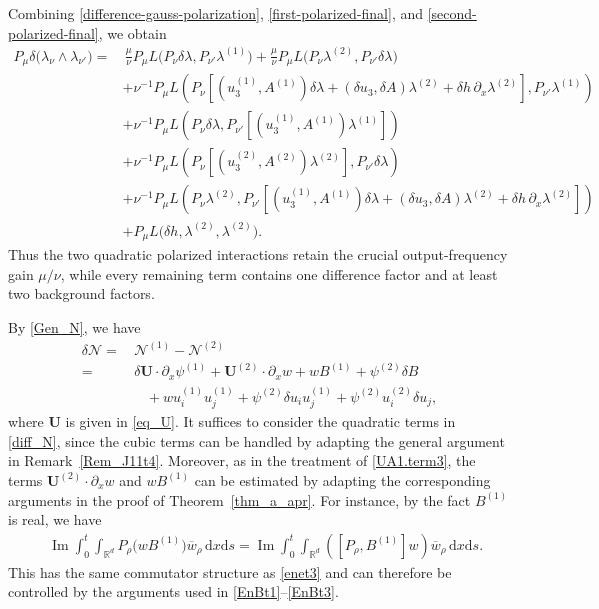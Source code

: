 \documentclass[11pt,letterpaper,reqno]{amsart}
\numberwithin{equation}{section}
\theoremstyle{definition}
\theoremstyle{remark}
\begin{document}
Combining
\eqref{difference-gauss-polarization},
\eqref{first-polarized-final}, and
\eqref{second-polarized-final}, we obtain
\begin{align}
P_\mu\delta
\bigl(
\lambda_\nu\wedge\lambda_{\nu'}
\bigr)
=&\,
\frac{\mu}{\nu}
P_\mu
L\bigl(
P_\nu\delta\lambda,
P_{\nu'}\lambda^{(1)}
\bigr)
 +
\frac{\mu}{\nu}
P_\mu
L\bigl(
P_\nu\lambda^{(2)},
P_{\nu'}\delta\lambda
\bigr)
\label{d4.polarized.codazzi}\\
&+
\nu^{-1}P_\mu
L\left(
P_\nu
\left[
(u_3^{(1)},A^{(1)})\delta\lambda
+
(\delta u_3,\delta A)\lambda^{(2)}
+
\delta h\,\partial_x\lambda^{(2)}
\right],
P_{\nu'}\lambda^{(1)}
\right)
\nonumber\\
&+
\nu^{-1}P_\mu
L\left(
P_\nu\delta\lambda,
P_{\nu'}
\left[
(u_3^{(1)},A^{(1)})\lambda^{(1)}
\right]
\right)
\nonumber\\
&+
\nu^{-1}P_\mu
L\left(
P_\nu
\left[
(u_3^{(2)},A^{(2)})\lambda^{(2)}
\right],
P_{\nu'}\delta\lambda
\right)
\nonumber\\
&+
\nu^{-1}P_\mu
L\left(
P_\nu\lambda^{(2)},
P_{\nu'}
\left[
(u_3^{(1)},A^{(1)})\delta\lambda
+
(\delta u_3,\delta A)\lambda^{(2)}
+
\delta h\,\partial_x\lambda^{(2)}
\right]
\right)
\nonumber\\
&+
P_\mu
L\bigl(
\delta h,\lambda^{(2)},\lambda^{(2)}
\bigr). \nonumber
\end{align}
Thus the two quadratic polarized interactions retain the crucial
output-frequency gain \(\mu/\nu\), while every remaining term contains
one difference factor and at least two background factors.
 




 
 
 
 
By   \eqref{Gen_N}, we have
\begin{align}
\delta \mathcal{N}= &\,\mathcal{N}^{(1)}-\mathcal{N}^{(2)}   \nonumber \\
=&\,\delta  \mathbf{U} \cdot\partial_x\psi^{(1)}
+\mathbf{U}^{(2)} \cdot\partial_xw+
wB^{(1)}
+\psi^{(2)}\delta B
\nonumber\\
&\quad
+w u_i^{(1)}u_j^{(1)}
+\psi^{(2)}\delta u_i u_j^{(1)}
+\psi^{(2)}u_i^{(2)}\delta u_j, \label{diff_N}
\end{align}
where \(\mathbf{U}\) is given in \eqref{eq_U}.
It suffices to consider the quadratic terms in \eqref{diff_N}, since the cubic terms can be handled by adapting the general argument in Remark~\ref{Rem_J11t4}. Moreover, as in the treatment of \eqref{UA1.term3}, the terms \(\mathbf{U}^{(2)} \cdot\partial_xw\) and \(
wB^{(1)}\) can be estimated by adapting the corresponding arguments in the proof of Theorem~\ref{thm_a_apr}.
For instance, by the fact \(B^{(1)}\) is real, we have
\begin{align*}
   &
        \operatorname{Im}\int_0^t\int_{\mathbb R^d}
        P_\rho\bigl(wB^{(1)} \bigr)
        \overline{w}_\rho\,\mathrm{d} x \mathrm{d} s  =\operatorname{Im}\int_0^t\int_{\mathbb R^d}
       ( [P_\rho,B^{(1)}]w )
        \overline{w}_\rho\, \mathrm{d} x \mathrm{d} s.
\end{align*}
This has the same commutator structure as \eqref{enet3} and can therefore be controlled by the arguments used in \eqref{EnBt1}--\eqref{EnBt3}.
\end{document}
